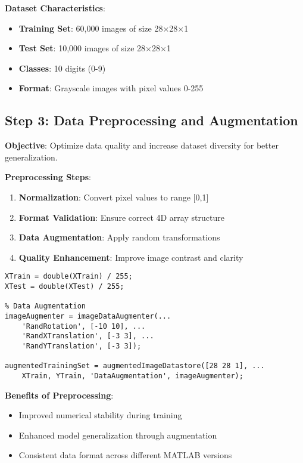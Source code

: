 \documentclass[12pt,a4paper]{article}
\begin{document}
\textbf{Dataset Characteristics}:
\begin{itemize}
    \item \textbf{Training Set}: 60,000 images of size 28×28×1
    \item \textbf{Test Set}: 10,000 images of size 28×28×1
    \item \textbf{Classes}: 10 digits (0-9)
    \item \textbf{Format}: Grayscale images with pixel values 0-255
\end{itemize}

\subsection{Step 3: Data Preprocessing and Augmentation}

\textbf{Objective}: Optimize data quality and increase dataset diversity for better generalization.

\textbf{Preprocessing Steps}:
\begin{enumerate}
    \item \textbf{Normalization}: Convert pixel values to range [0,1]
    \item \textbf{Format Validation}: Ensure correct 4D array structure
    \item \textbf{Data Augmentation}: Apply random transformations
    \item \textbf{Quality Enhancement}: Improve image contrast and clarity
\end{enumerate}

\begin{lstlisting}[caption=Data Preprocessing]
% Normalize pixel values to [0, 1]
XTrain = double(XTrain) / 255;
XTest = double(XTest) / 255;

% Data Augmentation
imageAugmenter = imageDataAugmenter(...
    'RandRotation', [-10 10], ...
    'RandXTranslation', [-3 3], ...
    'RandYTranslation', [-3 3]);

augmentedTrainingSet = augmentedImageDatastore([28 28 1], ...
    XTrain, YTrain, 'DataAugmentation', imageAugmenter);
\end{lstlisting}

\textbf{Benefits of Preprocessing}:
\begin{itemize}
    \item Improved numerical stability during training
    \item Enhanced model generalization through augmentation
    \item Consistent data format across different MATLAB versions
\end{itemize}
\end{document}
